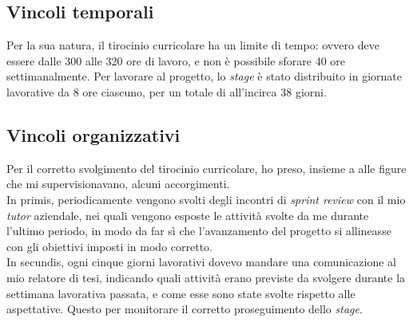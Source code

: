 \subsection{Vincoli temporali}\label{subsec:time-restrictions}\noindent
Per la sua natura, il tirocinio curricolare ha un limite di tempo: ovvero deve essere dalle 300 alle 320 ore di lavoro, e non è possibile sforare 40 ore settimanalmente.
Per lavorare al progetto, lo \textit{stage} è stato distribuito in giornate lavorative da 8 ore ciascuno, per un totale di all'incirca 38 giorni.

\subsection{Vincoli organizzativi}\noindent
Per il corretto svolgimento del tirocinio curricolare, ho preso, insieme a alle figure che mi supervisionavano, alcuni accorgimenti.\\
In primis, periodicamente vengono svolti degli incontri di \textit{sprint review} con il mio \textit{tutor} aziendale, nei quali vengono esposte le attività svolte da me durante l'ultimo periodo, in modo da far sì che l'avanzamento del progetto si allineasse con gli obiettivi imposti in modo corretto.\\
In secundis, ogni cinque giorni lavorativi dovevo mandare una comunicazione al mio relatore di tesi, indicando quali attività erano previste da svolgere durante la settimana lavorativa passata, e come esse sono state svolte rispetto alle aspettative. Questo per monitorare il corretto proseguimento dello \textit{stage}.

